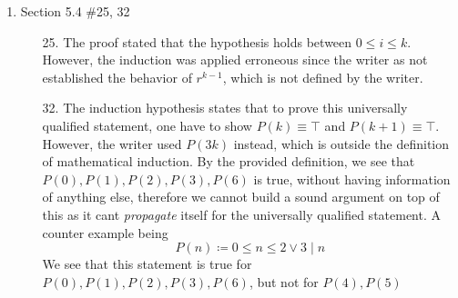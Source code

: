 \documentclass[12pt]{article}
\newcommand{\T}[0]{\top}
\newcommand{\sqbkt}[1]{\left[ #1 \right]}
\newcommand{\paren}[1]{\left( #1 \right)}
\begin{document}
\begin{enumerate}
\begin{proof}
\[                \]
            factoring to get
                \[
                f_{k+1} = \frac{1}{\sqrt{5}} \sqbkt{\paren{\frac{1+\sqrt{5}}{2}}^{k+1} - \paren{\frac{1-\sqrt{5}}{2}}^{k+1} + 
                \paren{\frac{1+\sqrt{5}}{2}}^{k} - \paren{\frac{1-\sqrt{5}}{2}}^{k}}
                \]
            keep factoring to get
                \[
                f_{k+1} = \frac{1}{\sqrt{5}}\sqbkt{
                \paren{\frac{1+\sqrt{5}}{2}}^{k}\paren{\frac{1+\sqrt{5}}{2} + 1}
                -
                \paren{\frac{1-\sqrt{5}}{2}}^{k}\paren{\frac{1-\sqrt{5}}{2} +1}
                }   
                \]
            simplifying, we have
                \[
                f_{k+1} = \frac{1}{\sqrt{5}}\sqbkt{
                \paren{\frac{1+\sqrt{5}}{2}}^{k}\paren{\frac{3+\sqrt{5}}{2}}
                -
                \paren{\frac{1-\sqrt{5}}{2}}^{k}\paren{\frac{3-\sqrt{5}}{2}}
                }
                \]
            we multiply the numerator and the denominator by 2 for the following terms
                \[
                f_{k+1} = \frac{1}{\sqrt{5}}\sqbkt{
                \paren{\frac{1+\sqrt{5}}{2}}^{k}\paren{\frac{6+2\sqrt{5}}{4}}
                -
                \paren{\frac{1-\sqrt{5}}{2}}^{k}\paren{\frac{6-2\sqrt{5}}{4}}
                }
                \]
            We notice that, this is
                \[
                f_{k+1} = \frac{1}{\sqrt{5}}\sqbkt{
                \paren{\frac{1+\sqrt{5}}{2}}^{k}\paren{\frac{1+\sqrt{5}}{2}}^2
                -
                \paren{\frac{1-\sqrt{5}}{2}}^{k}\paren{\frac{1-\sqrt{5}}{2}}^2
                }
                \]
            which is 
                \[
                f_{k+1}=\frac{1}{\sqrt{5}}\sqbkt{\paren{\frac{1+\sqrt{5}}{2}}^{k+2} - \paren{\frac{1-\sqrt{5}}{2}}^{k+2}}
                \]
                
                
            
        \end{proof}

    \newpage
    \item Section 5.4 \#25, 32
        \begin{enumerate}
            \item[25.] The proof stated that the hypothesis holds between $0 \leq i \leq k$. However, the induction was applied erroneous since the writer as not established the behavior of $r^{k-1}$, which is not defined by the writer. 
            \item[32.] The induction hypothesis states that to prove this universally qualified statement, one have to show $P(k)\equiv \T$ and $P(k+1)\equiv \T$. However, the writer used $P(3k)$ instead, which is outside the definition of mathematical induction. By the provided definition, we see that $P(0),P(1),P(2),P(3),P(6)$ is true, without having information of anything else, therefore we cannot build a sound argument on top of this as it cant \textit{propagate} itself for the universally qualified statement. A counter example being 
            \[
            P(n)\coloneqq 0 \leq n \leq 2 \vee 3 \mid n
            \]
            We see that this statement is true for $P(0),P(1),P(2),P(3),P(6)$, but not for $P(4),P(5)$
            

\end{enumerate}
\end{enumerate}
\end{document}
